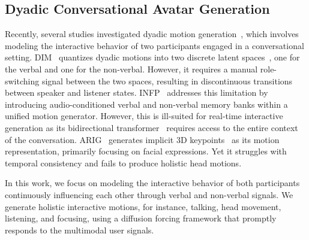 \subsection{Dyadic Conversational Avatar Generation}
Recently, several studies investigated dyadic motion generation~\citep{dim, infp, arig}, which involves modeling the interactive behavior of two participants engaged in a conversational setting.
DIM~\citep{dim} quantizes dyadic motions into two discrete latent spaces~\citep{vqvae}, one for the verbal and one for the non-verbal. However, it requires a manual role-switching signal between the two spaces, resulting in discontinuous transitions between speaker and listener states. INFP~\citep{infp} addresses this limitation by introducing audio-conditioned verbal and non-verbal memory banks within a unified motion generator. 
However, this is ill-suited for real-time interactive generation as its bidirectional transformer~\citep{dit} requires access to the entire context of the conversation.
ARIG~\citep{arig} generates implicit 3D keypoints~\citep{liveportrait} as its motion representation, primarily focusing on facial expressions. Yet it struggles with temporal consistency and fails to produce holistic head motions.

In this work, we focus on modeling the interactive behavior of both participants continuously influencing each other through verbal and non-verbal signals. We generate holistic interactive motions, for instance, talking, head movement, listening, and focusing, using a diffusion forcing framework that promptly responds to the multimodal user signals. 
